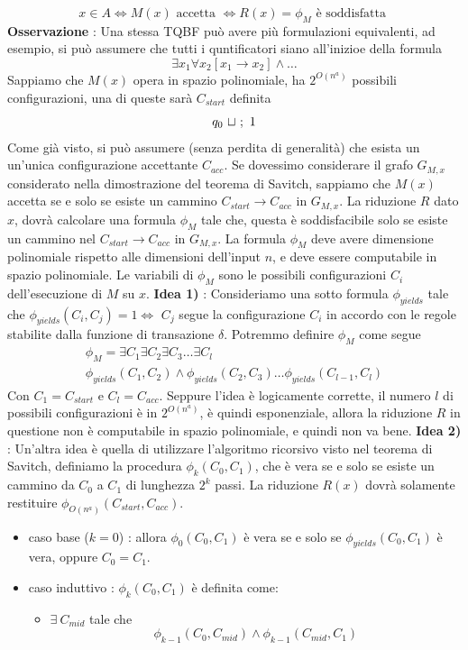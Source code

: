 \documentclass[10pt, letterpaper]{report}
\begin{document}
$$ x\in A \iff M(x)\text{ accetta }\iff R(x)=\phi_M \text{ è soddisfatta }$$
\textbf{Osservazione} : Una stessa TQBF può avere più formulazioni equivalenti, ad esempio, si può assumere che tutti i quntificatori siano all'inizioe della formula 
$$ \exists x_1 \forall x_2 [x_1\rightarrow x_2]\land \dots$$
Sappiamo che $M(x)$ opera in spazio polinomiale, ha $2^{O(n^a)}$ possibili configurazioni, una di queste sarà $C_{start}$ definita $$ q_0 \ {\sqcup} \ ; \  1$$
Come già visto, si può assumere (senza perdita di generalità) che esista un un'unica configurazione accettante $C_{acc}$.\acc 
Se dovessimo considerare il grafo $G_{M,x}$ considerato nella dimostrazione del teorema di Savitch, sappiamo che $M(x)$ accetta se e solo se esiste un cammino $C_{start}\longrightarrow C_{acc}$ in $G_{M,x}$.\acc 
La riduzione $R$ dato $x$, dovrà calcolare una formula $\phi_M$ tale che, questa è soddisfacibile solo se esiste un cammino nel $C_{start}\longrightarrow C_{acc}$ in $G_{M,x}$. La formula $\phi_M$ deve avere dimensione polinomiale rispetto alle dimensioni dell'input $n$, e deve essere computabile in spazio polinomiale.\acc 
Le variabili di $\phi_M$ sono le possibili configurazioni $C_i$ dell'esecuzione di $M$ su $x$.\acc 
\textbf{Idea 1)} : Consideriamo una sotto formula $\phi_{yields}$ tale che  $\phi_{yields}(C_i,C_j)=1\iff$ $C_j$ segue la configurazione $C_i$ in accordo con le regole stabilite dalla funzione di transazione $\delta$. Potremmo definire $\phi_M$ come segue 
$$ \begin{matrix}
    \phi_M=\exists C_1\exists C_2\exists C_3 \dots \exists C_l\\ 
    \phi_{yields}(C_1,C_2)\land\phi_{yields}(C_2,C_3)\dots \phi_{yields}(C_{l-1},C_l)
\end{matrix}$$
Con $C_1=C_{start}$ e $C_l=C_{acc}$. Seppure l'idea è logicamente corrette, il numero $l$ di possibili configurazioni è in $2^{O(n^a)}$, è quindi esponenziale, allora la riduzione $R$ in questione non è computabile in spazio polinomiale, e quindi non va bene.\acc
\textbf{Idea 2)} : Un'altra idea è quella di utilizzare l'algoritmo ricorsivo visto nel teorema di Savitch, definiamo la procedura $\phi_k(C_0,C_1)$, che è vera se e solo se esiste un cammino da $C_0$ a $C_1$ di lunghezza $2^k$ passi. La riduzione $R(x)$ dovrà solamente restituire $\phi_{O(n^a)}(C_{start},C_{acc})$.\begin{itemize}
    \item caso base ($k=0$) : allora $\phi_0(C_0,C_1)$ è vera se e solo se $\phi_{yields}(C_0,C_1)$ è vera, oppure $C_0=C_1$. 
    \item caso induttivo : $\phi_k(C_0,C_1)$ è definita come:\begin{itemize}
        \item $\exists \ C_{mid}$ tale che $$\phi_{k-1}(C_0,C_{mid})\land \phi_{k-1}(C_{mid},C_1) $$ 
    \end{itemize}
\end{itemize}
\end{document}
